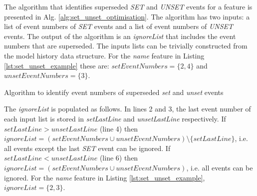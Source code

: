 \documentclass{llncs}
\begin{document}
The algorithm that identifies superseded \emph{SET} and \emph{UNSET} events for a feature is presented in Alg. \ref{alg:set_unset_optimisation}.
The algorithm has two inputs: a list of event numbers of \emph{SET} events and a list of event numbers of \emph{UNSET} events.
The output of the algorithm is an \emph{ignoreList} that includes the event numbers that are superseded.
The inputs lists can be trivially constructed from the model history data structure.
For the \emph{name} feature in Listing \ref{lst:set_unset_example} these are: $setEventNumbers = \{2,4\}$ and $unsetEventNumbers = \{3\}$.

\begin{algorithm}[H]
\begin{small}
\end{small}
\caption{Algorithm to identify event numbers of superseded \emph{set} and \emph{unset} events}
\label{alg:set_unset_optimisation}
\end{algorithm}

The \emph{ignoreList} is populated as follows.
In lines 2 and 3, the last event number of each input list is stored in \emph{setLastLine} and \emph{unsetLastLine} respectively.
If $setLastLine > unsetLastLine$ (line 4) then $ignoreList = (setEventNumbers \cup unsetEventNumbers) \setminus  \{setLastLine\} $, i.e. all events except the last \emph{SET} event can be ignored.
If $setLastLine < unsetLastLine$ (line 6) then $ignoreList = (setEventNumbers \cup unsetEventNumbers)$, i.e. all events can be ignored.
For the \emph{name} feature in Listing \ref{lst:set_unset_example}, $ignoreList = \{2, 3\}$.
\end{document}
